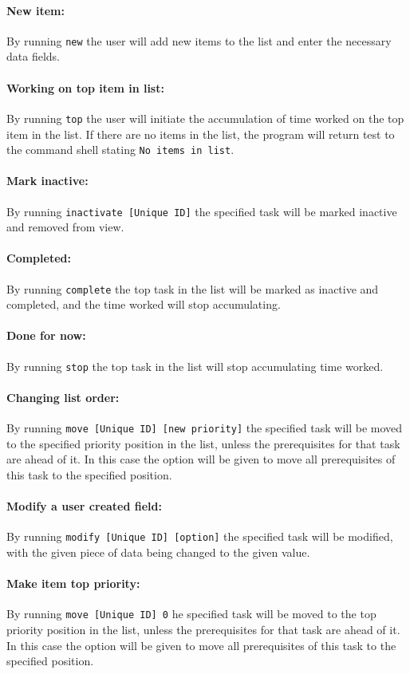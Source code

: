 \documentclass[12pt]{article}
\newcommand{\e}[1] {{\tt #1}}
\begin{document}
\paragraph{New item:} \label{sec:New item} By running \e{new} the user will add new items to the list and enter the necessary data fields.
\paragraph{Working on top item in list:} \label{sec:Working on top} By running \e{top} the user will initiate the accumulation of time worked on the top item in the list. If there are no items in the list, the program will return test to the command shell stating \e{No items in list}.
\paragraph{Mark inactive:} \label{sec:Mark inactive} By running \e{inactivate [Unique ID]} the specified task will be marked inactive and removed from view.
\paragraph{Completed:} \label{sec:Completed} By running \e{complete} the top task in the list will be marked as inactive and completed, and the time worked will stop accumulating.
\paragraph{Done for now:} \label{sec:Done for now} By running \e{stop} the top task in the list will stop accumulating time worked.
\paragraph{Changing list order:} \label{sec:Change order} By running \e{move [Unique ID] [new priority]} the specified task will be moved to the specified priority position in the list, unless the prerequisites for that task are ahead of it. In this case the option will be given to move all prerequisites of this task to the specified position.
\paragraph{Modify a user created field:} \label{sec:Modify} By running \e{modify [Unique ID] [option]} the specified task will be modified, with the given piece of data being changed to the given value.
\paragraph{Make item top priority:} \label{sec:Make top} By running \e{move [Unique ID] 0} he specified task will be moved to the top priority position in the list, unless the prerequisites for that task are ahead of it. In this case the option will be given to move all prerequisites of this task to the specified position.
\end{document}

